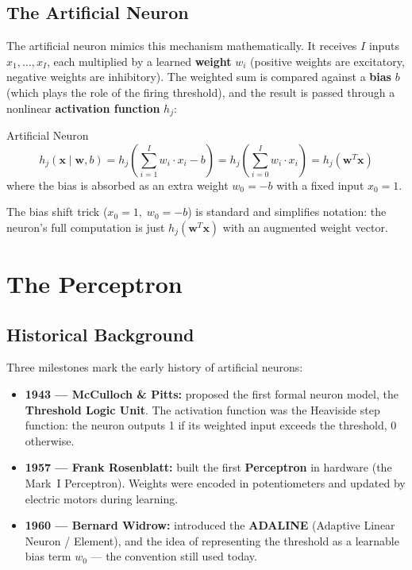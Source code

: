 \documentclass[11pt,a4paper]{article}
\newcommand{\term}[1]{\textcolor{DefGreen}{\textbf{#1}}}
\begin{document}
\subsection{The Artificial Neuron}

The artificial neuron mimics this mechanism mathematically. It receives $I$ inputs $x_1, \ldots, x_I$, each multiplied by a learned \term{weight} $w_i$ (positive weights are excitatory, negative weights are inhibitory). The weighted sum is compared against a \term{bias} $b$ (which plays the role of the firing threshold), and the result is passed through a nonlinear \term{activation function} $h_j$:

\begin{defbox}{Artificial Neuron}
\[
h_j(\mathbf{x} \mid \mathbf{w}, b) = h_j\!\left(\sum_{i=1}^{I} w_i \cdot x_i - b\right)
= h_j\!\left(\sum_{i=0}^{I} w_i \cdot x_i\right) = h_j(\mathbf{w}^T \mathbf{x})
\]
where the bias is absorbed as an extra weight $w_0 = -b$ with a fixed input $x_0 = 1$.
\end{defbox}

The bias shift trick ($x_0 = 1,\; w_0 = -b$) is standard and simplifies notation: the neuron's full computation is just $h_j(\mathbf{w}^T\mathbf{x})$ with an augmented weight vector.

\section{The Perceptron}

\subsection{Historical Background}

Three milestones mark the early history of artificial neurons:
\begin{itemize}
  \item \textbf{1943 — McCulloch \& Pitts:} proposed the first formal neuron model, the \term{Threshold Logic Unit}. The activation function was the Heaviside step function: the neuron outputs 1 if its weighted input exceeds the threshold, 0 otherwise.
  \item \textbf{1957 — Frank Rosenblatt:} built the first \term{Perceptron} in hardware (the Mark~I Perceptron). Weights were encoded in potentiometers and updated by electric motors during learning.
  \item \textbf{1960 — Bernard Widrow:} introduced the \term{ADALINE} (Adaptive Linear Neuron / Element), and the idea of representing the threshold as a learnable bias term $w_0$ — the convention still used today.
\end{itemize}
\end{document}
